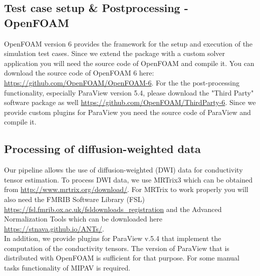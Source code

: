 \subsection{Test case setup \& Postprocessing - OpenFOAM}
OpenFOAM version 6 provides the framework for the setup and execution of the simulation test cases. Since we extend the package
with a custom solver application you will need the source code of OpenFOAM and compile it. You can download the source code of
OpenFOAM 6 here: \url{https://github.com/OpenFOAM/OpenFOAM-6}. For the the post-processing functionality, especially ParaView
version 5.4, please download the "Third Party" software package as well \url{https://github.com/OpenFOAM/ThirdParty-6}. Since we
provide custom plugins for ParaView you need the source code of ParaView and compile it.

\subsection{Processing of diffusion-weighted data}
Our pipeline allows the use of diffusion-weighted (DWI) data for conductivity tensor estimation. To process DWI data, we use
MRTrix3 which can be obtained from \url{http://www.mrtrix.org/download/}. For MRTrix to work properly you will also need
the FMRIB Software Library (FSL) \url{https://fsl.fmrib.ox.ac.uk/fsldownloads\_registration} and the Advanced Normalization Tools
which can be downloaded here \url{https://stnava.github.io/ANTs/}.\\
In addition, we provide plugins for ParaView v.5.4 that implement the computation of the conductivity tensors. The version of
ParaView that is distributed with OpenFOAM is sufficient for that purpose. For some manual tasks functionality of MIPAV is required.


